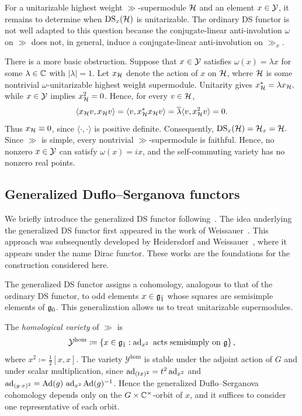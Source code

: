 For a unitarizable highest weight $\gg$-supermodule ${\mathcal{H}}$ and an element $x\in{\mathcal Y}$, it remains to determine when $\operatorname{DS}_{x}({\mathcal{H}})$ is unitarizable. The ordinary DS functor is not well adapted to this question because the conjugate-linear anti-involution $\omega$ on $\gg$ does not, in general, induce a conjugate-linear anti-involution on $\gg_{x}$.

There is a more basic obstruction. Suppose that $x\in{\mathcal Y}$ satisfies
$
\omega(x)=\lambda x
$
for some $\lambda\in{\mathbb C}$ with $|\lambda|=1$. Let $x_{{\mathcal{H}}}$ denote the action of $x$ on ${\mathcal{H}}$, where ${\mathcal{H}}$ is some nontrivial $\omega$-unitarizable highest weight supermodule. Unitarity gives
$
x_{{\mathcal{H}}}^{\ast}=\lambda x_{{\mathcal{H}}},
$
while $x\in{\mathcal Y}$ implies $x_{{\mathcal{H}}}^{2}=0$. Hence, for every $v\in{\mathcal{H}}$,
\begin{equation}
\langle x_{{\mathcal{H}}}v,x_{{\mathcal{H}}}v\rangle
=
\langle v,x_{{\mathcal{H}}}^{\ast}x_{{\mathcal{H}}}v\rangle 
=
\overline{\lambda}\langle v,x_{{\mathcal{H}}}^{2}v\rangle
=
0.
\end{equation}
Thus $x_{{\mathcal{H}}}\equiv 0$, since $\langle\cdot,\cdot\rangle$ is positive definite. Consequently,
$
\operatorname{DS}_{x}({\mathcal{H}})={\mathcal{H}}_{x}={\mathcal{H}}.
$
Since $\gg$ is simple, every nontrivial $\gg$-supermodule is faithful. Hence, no nonzero $x\in{\mathcal Y}$ can satisfy $\omega(x)=ix$, and the self-commuting variety has no nonzero real points.


\subsection{Generalized Duflo--Serganova functors}
\label{subsec::generalized_DS_functor} 
We briefly introduce the generalized DS functor following~\cite{GorelikSherman2024,Sherman2025}. The idea underlying the generalized DS functor first appeared in the work of Weissauer~\cite{Weissauer2010}. This approach was subsequently developed by Heidersdorf and Weissauer~\cite[Sections~5--6]{heidersdorf2021cohomological}, where it appears under the name Dirac functor. These works are the foundations for the construction considered here.

The generalized DS functor assigns a cohomology, analogous to that of the ordinary DS functor, to odd elements $x\in{\mathfrak{g}_{\bar{1}}}$ whose squares are semisimple elements of ${\mathfrak{g}_{\bar{0}}}$. This generalization allows us to treat unitarizable supermodules.

The \emph{homological variety} of $\gg$ is
\begin{equation}
\mathcal{Y}^{\mathrm{hom}}
\coloneqq 
\left\{
x\in{\mathfrak{g}}_{\bar1}
: 
\operatorname{ad}_{x^{2}}\text{ acts semisimply on }{\mathfrak{g}}
\right\},
\end{equation}
where $x^{2}\coloneqq \frac{1}{2}[x,x]$. 
The variety $\mathcal{Y}^{\mathrm{hom}}$ is stable under the adjoint action of $G$ and under scalar multiplication, since $\operatorname{ad}_{(tx)^2}=t^2\operatorname{ad}_{x^2}$ and $\operatorname{ad}_{(g\cdot x)^2}=\operatorname{Ad}(g)\,\operatorname{ad}_{x^2}\operatorname{Ad}(g)^{-1}$. Hence the generalized Duflo--Serganova cohomology depends only on the $G\times{\mathbb C}^\times$-orbit of $x$, and it suffices to consider one representative of each orbit.

